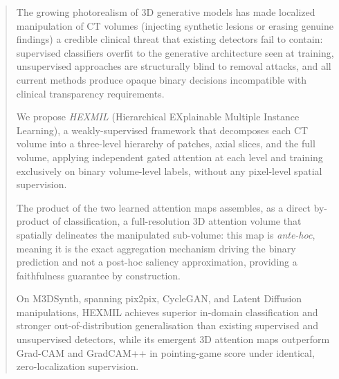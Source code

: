 \begin{abstract}
The growing photorealism of 3D generative models has made localized manipulation of CT volumes
(injecting synthetic lesions or erasing genuine findings) a credible clinical threat that
existing detectors fail to contain: supervised classifiers overfit to the generative architecture
seen at training, unsupervised approaches are structurally blind to removal attacks, and all
current methods produce opaque binary decisions incompatible with clinical transparency requirements.

We propose \textit{HEXMIL} (Hierarchical EXplainable Multiple Instance Learning), a weakly-supervised
framework that decomposes each CT volume into a three-level hierarchy of patches, axial slices,
and the full volume, applying independent gated attention at each level and training exclusively
on binary volume-level labels, without any pixel-level spatial supervision.

The product of the two learned attention maps assembles, as a direct by-product of classification,
a full-resolution 3D attention volume that spatially delineates the manipulated sub-volume: this
map is \emph{ante-hoc}, meaning it is the exact aggregation mechanism driving the binary prediction
and not a post-hoc saliency approximation, providing a faithfulness guarantee by construction.

On M3DSynth, spanning pix2pix, CycleGAN, and Latent Diffusion manipulations, HEXMIL achieves
superior in-domain classification and stronger out-of-distribution generalisation than existing
supervised and unsupervised detectors, while its emergent 3D attention maps outperform Grad-CAM
and GradCAM++ in pointing-game score under identical, zero-localization supervision.
\end{abstract}
